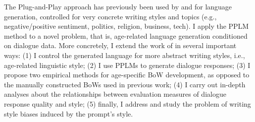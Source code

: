 The Plug-and-Play approach has previously been used by \cite{dathathri2019plug} and \cite{madotto-etal-2020-plug} for language generation, controlled for very concrete writing styles and topics (e.g., negative/positive sentiment, politics, religion, business, tech). I apply the PPLM method to a novel problem, that is, age-related language generation conditioned on dialogue data. More concretely, I extend the work of \cite{dathathri2019plug} in several important ways: (1) I control the generated language for more abstract writing styles, i.e., age-related linguistic style; (2) I use PPLMs to generate dialogue responses; (3) I propose two empirical methods for age-specific BoW development, as opposed to the manually constructed BoWs used in previous work; (4) I carry out in-depth analyses about the relationships between evaluation measures of dialogue response quality and style; (5) finally, I address and study the problem of writing style biases induced by the prompt's style.



